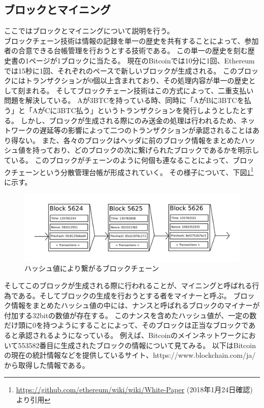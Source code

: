 \subsection{ブロックとマイニング}
ここではブロックとマイニングについて説明を行う。 \\
ブロックチェーン技術は情報の記録を単一の歴史を共有することによって、参加者の合意できる台帳管理を行おうとする技術である。
この単一の歴史を刻む歴史書の1ページが1ブロックに当たる。
現在のBitcoinでは10分に1回、Ethereumでは15秒に1回、それぞれのペースで新しいブロックが生成される。
このブロックにはトランザクションが0個以上含まれており、その処理内容が単一の歴史として刻まれる。
そしてブロックチェーン技術はこの方式によって、二重支払い問題を解決している。
Aが3BTCを持っている時、同時に「AがBに3BTCを払う」と「AがCに3BTC払う」というトランザクションを発行しようとしたとする。
しかし、ブロックが生成される際にのみ送金の処理は行われるため、ネットワークの遅延等の影響によって二つのトランザクションが承認されることはあり得ない。
また、各々のブロックはヘッダに前のブロック情報をまとめたハッシュ値を持っており、どのブロックの次に繋げられたブロックであるかを明示している。
このブロックがチェーンのように何個も連なることによって、ブロックチェーンという分散管理台帳が形成されていく。 
その様子について、下図\ref{block}\footnote{\url{https://github.com/ethereum/wiki/wiki/White-Paper} (2018年1月24日確認) より引用}に示す。
\begin{figure}[htbp]
 \centering
  \includegraphics[width=120mm]{image/block.png}
 \caption{ハッシュ値により繋がるブロックチェーン }
 \label{block}
\end{figure}
そしてこのブロックが生成される際に行われることが、マイニングと呼ばれる行為である。そしてブロックの生成を行おうとする者をマイナーと呼ぶ。
ブロック情報をまとめたハッシュ値の中には、ナンスと呼ばれるブロックのマイナーが付加する32bitの数値が存在する。
このナンスを含めたハッシュ値が、一定の数だけ頭に0を持つようにすることによって、そのブロックは正当なブロックであると承認されるようになっている。
例えば、Bitcoinのメインネットワークにおいて553582番目に生成されたブロックの情報について見てみる。
以下はBitcoinの現在の統計情報などを提供しているサイト、https://www.blockchain.com/ja/ から取得した情報である。
